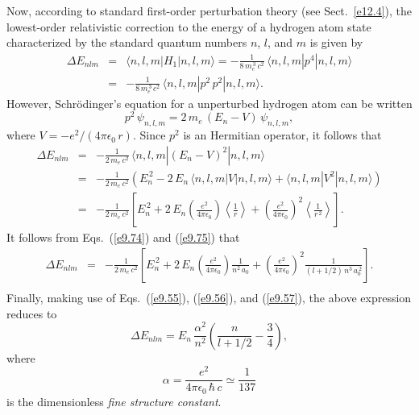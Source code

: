 Now, according to standard first-order perturbation theory (see Sect.~\ref{e12.4}), the lowest-order relativistic correction to the energy of a hydrogen atom state characterized
by the standard quantum numbers $n$, $l$, and $m$ is given by
\begin{eqnarray}
\Delta E_{nlm} &=& \langle n,l,m|H_1|n,l,m\rangle = - \frac{1}{8\,m_e^{\,3}\,c^2}\,
\langle n,l,m|p^4|n,l,m\rangle\nonumber\\[0.5ex]
&=& - \frac{1}{8\,m_e^{\,3}\,c^2}\,
\langle n,l,m|p^2\,p^2|n,l,m\rangle.
\end{eqnarray}
However, Schr\"{o}dinger's equation for a unperturbed hydrogen atom
can be written
\begin{equation}
p^2\,\psi_{n,l,m} = 2\,m_e\,(E_n-V)\,\psi_{n,l,m},
\end{equation}
where $V=-e^2/(4\pi\epsilon_0\,r)$. 
Since $p^2$ is an Hermitian operator, it follows that
\begin{eqnarray}
\Delta E_{nlm} &=& -\frac{1}{2\,m_e\,c^2}\,\langle n,l,m|(E_n -V)^2|n,l,m\rangle\nonumber\\[0.5ex]
&=& -\frac{1}{2\,m_e\,c^2}\left(E_n^{\,2} - 2\,E_n\,\langle
n,l,m|V|n,l,m\rangle + \langle n,l,m|V^2|n,l,m\rangle\right)\nonumber\\[0.5ex]
&=& -\frac{1}{2\,m_e\,c^2}\left[
E_n^{\,2} + 2\,E_n\left(\frac{e^2}{4\pi\epsilon_0}\right)\left\langle
\frac{1}{r}\right\rangle + \left(\frac{e^2}{4\pi\epsilon_0}\right)^2\left\langle\frac{1}{r^{\,2}}\right\rangle\right].
\end{eqnarray}
It follows from Eqs.~(\ref{e9.74}) and (\ref{e9.75}) that
\begin{eqnarray}
\Delta E_{nlm} &=& -\frac{1}{2\,m_e\,c^2}\left[
E_n^{\,2} + 2\,E_n\left(\frac{e^2}{4\pi\epsilon_0}\right)\frac{1}{n^2\,a_0} + \left(\frac{e^2}{4\pi\epsilon_0}\right)^2\frac{1}{(l+1/2)\,n^3\,a_0^{\,2}}\right].\nonumber\\[0.5ex]&&
\end{eqnarray}
Finally, making use of Eqs.~(\ref{e9.55}), (\ref{e9.56}), and (\ref{e9.57}), the above expression reduces to
\begin{equation}\label{e12.121}
\Delta E_{nlm} = E_n\,\frac{\alpha^2}{n^2}\left(\frac{n}{l+1/2}-\frac{3}{4}\right),
\end{equation}
where
\begin{equation}
\alpha = \frac{e^2}{4\pi\epsilon_0\,\hbar\,c}\simeq \frac{1}{137}
\end{equation}
is the dimensionless  {\em fine structure constant}.

